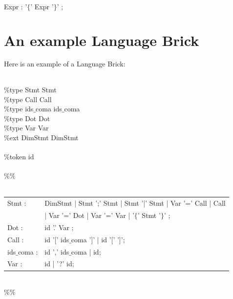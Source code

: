 \documentclass[11pt,fleqn]{book} %
\begin{document}
\begin{theorem}
Expr : '$\{$' Expr '$\}$' ;  
\end{theorem}

\section{An example Language Brick}

Here is an example of a Language Brick:

\begin{theorem}
\ \\
$\%$type Stmt Stmt\\
$\%$type Call Call\\
$\%$type ids$\_$coma ids$\_$coma\\
$\%$type Dot Dot\\
$\%$type Var Var\\ 
$\%$ext DimStmt DimStmt\\
\\
$\%$token id\\ 
\\
$\%\%$\\
\\
\begin{tabular}{l l}
Stmt : & DimStmt | Stmt ';' Stmt | Stmt '|' Stmt | Var '=' Call | Call \\ 
& | Var '=' Dot | Var '=' Var | '$\{$' Stmt '$\}$' ;\\
Dot : & id '.' Var ;\\
Call : & id '[' ids$\_$coma ']' | id '[' ']';\\
ids$\_$coma : & id ',' ids$\_$coma  | id; \\
Var : & id | '?' id;\\
\end{tabular}
\\
$\%\%$
\end{theorem}






\end{document}
